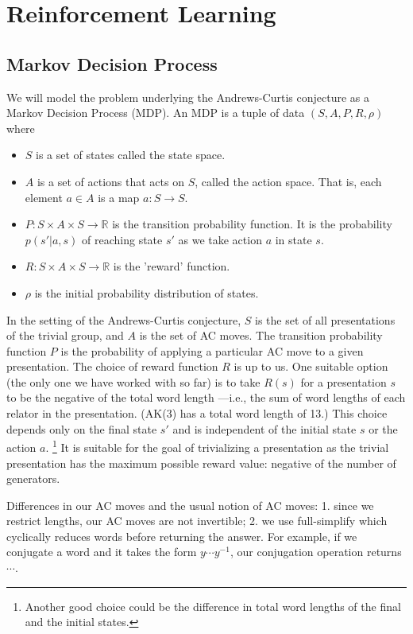 
\section{Reinforcement Learning}

\subsection{Markov Decision Process}

We will model the problem underlying the Andrews-Curtis conjecture as a Markov Decision Process (MDP).
An MDP is a tuple of data $(S, A, P, R, \rho)$ where
\begin{itemize}
	\item $S$ is a set of states called the state space.
	\item $A$ is a set of actions that acts on $S$, called the action space.
	That is, each element $a \in A$ is a map $a: S \to S$.
	\item $P: S \times A \times S \to \mathbb{R}$ is the transition
	probability function.
	It is the probability $p (s' | a, s)$ of reaching
	state $s'$ as we take action $a$ in state $s$.
	\item $R: S \times A \times S \to \mathbb{R}$ is the 'reward' function.
	\item $\rho$ is the initial probability distribution of states.
\end{itemize}

In the setting of the Andrews-Curtis conjecture, $S$ is the set of all presentations of the trivial group, and $A$ is the set of AC moves.
The transition probability function $P$ is the probability of applying a particular AC move to a given presentation.
The choice of reward function $R$ is up to us.
One suitable option (the only one we have worked with so far) is to take $R(s)$ for a presentation $s$ to be the negative of the total word length ---i.e., the sum of word lengths of each relator in the presentation.
(AK(3) has a total word length of 13.)
This choice depends only on the final state $s'$ and is independent of the initial state $s$
or the action $a$.
\footnote{Another good choice could be the difference in total word lengths of the final and the initial states.} It is suitable for the goal of trivializing a presentation as the trivial presentation has the maximum possible reward value: negative of the number of generators.

Differences in our AC moves and the usual notion of AC moves: 1.
since we restrict lengths, our AC moves are not invertible; 2.
we use full-simplify which cyclically reduces words before returning the answer.
For example, if we conjugate a word and it takes the form $y \cdots y^{-1}$, our conjugation operation returns $\cdots$.

